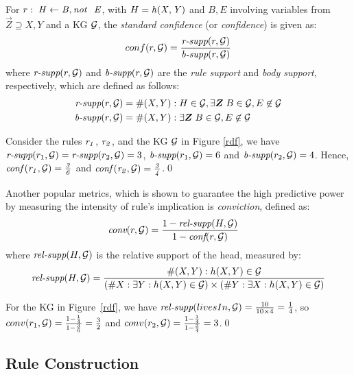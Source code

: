 For $r:\;\mi{H\leftarrow B, \naf\ E}$, with $H=\mathit{h(X,Y)}$ and $B,E$ involving variables from $\vec{Z}\supseteq X,Y$ and a KG $\mathcal{G}$, the \emph{standard confidence} (or \textit{confidence}) is given as:\vspace{-.26cm}
\begin{align*}
conf(r,\mathcal{G})= \frac{\textit{r-supp}(r,\mathcal{G})}{\textit{b-supp}(r,\mathcal{G})}
\end{align*}
where $\textit{r-supp}(r,\mathcal{G})$ and $\textit{b-supp}(r ,\mathcal{G})$ are the \textit{rule support} and \textit{body support}, respectively, which are defined as follows:
\begin{align*}
\textit{r-supp}(r,\cG) &= \#(X,Y): H \in \cG, \exists \vec{Z}\;B\in \cG,E \not \in \cG\\
\textit{b-supp}(r,\cG) &= \#(X,Y):\exists \vec{Z}\; B\in \cG, E \not \in \cG
\end{align*}
\begin{example}
Consider the rules $\mathit{r_1}$, $\mathit{r_2}$, and the KG $\mathcal{G}$ in Figure \ref{rdf}, we have $\textit{r-supp}(r_1,\mathcal{G}) = \textit{r-supp}(r_2,\mathcal{G}) = 3$, $\textit{b-supp}(r_1,\mathcal{G}) = 6$ and $\textit{b-supp}(r_2,\mathcal{G}) = 4$.
Hence, $\mathit{conf(r_1,\mathcal{G}) = \frac{3}{6}}$ and $\mathit{conf(r_2,\mathcal{G}) = \frac{3}{4}}$.\qed
\end{example}

Another popular metrics, which is shown to guarantee the high predictive power \cite{Azevedo2007} by measuring the intensity of rule's implication \cite{metrics-summary} is \emph{conviction}, defined as:
\begin{align*}
\textit{conv}(r,\mathcal{G}) & = \frac{1 - \textit{rel-supp}(H, \mathcal{G})}{1-\textit{conf}(r,\mathcal{G})}
\end{align*}
where $\textit{rel-supp}(H, \mathcal{G})$ is the relative support of the head, measured by:
\begin{align*}
\textit{rel-supp}(H, \mathcal{G}) = \dfrac{\#(X,Y):h(X,Y)\in \mathcal{G}}{(\#X:\exists Y:h(X,Y)\in \mathcal{G})\times(\#Y:\exists X:h(X,Y)\in \mathcal{G})}
\end{align*}
\begin{example}
For the KG in Figure~\ref{rdf}, we have $\textit{rel-supp}(livesIn, \mathcal{G}) = \frac{10}{10 \times 4} = \frac{1}{4}$, so $conv(r_1,\mathcal{G}) = \frac{1-\frac{1}{4}}{1-\frac{3}{6}} = \frac{3}{2}$ and $conv(r_2,\mathcal{G}) = \frac{1-\frac{1}{4}}{1-\frac{3}{4}} = 3$.\qed
\end{example}

\subsection{Rule Construction}
\label{subsec:rule_const}

